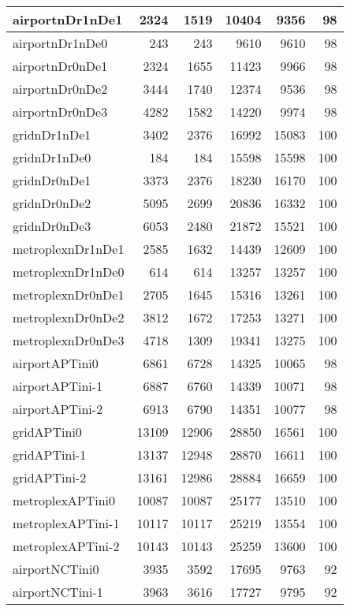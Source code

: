 \documentclass[../../../thesis.tex]{subfiles}
\begin{document}
\begin{longtable}{|l|r|r|r|r|r|}
\endlastfoot
airportnDr1nDe1 & 2324 & 1519 & 10404 & 9356 & 98 \\ \hline
airportnDr1nDe0 & 243 & 243 & 9610 & 9610 & 98 \\ \hline
airportnDr0nDe1 & 2324 & 1655 & 11423 & 9966 & 98 \\ \hline
airportnDr0nDe2 & 3444 & 1740 & 12374 & 9536 & 98 \\ \hline
airportnDr0nDe3 & 4282 & 1582 & 14220 & 9974 & 98 \\ \hline
gridnDr1nDe1 & 3402 & 2376 & 16992 & 15083 & 100 \\ \hline
gridnDr1nDe0 & 184 & 184 & 15598 & 15598 & 100 \\ \hline
gridnDr0nDe1 & 3373 & 2376 & 18230 & 16170 & 100 \\ \hline
gridnDr0nDe2 & 5095 & 2699 & 20836 & 16332 & 100 \\ \hline
gridnDr0nDe3 & 6053 & 2480 & 21872 & 15521 & 100 \\ \hline
metroplexnDr1nDe1 & 2585 & 1632 & 14439 & 12609 & 100 \\ \hline
metroplexnDr1nDe0 & 614 & 614 & 13257 & 13257 & 100 \\ \hline
metroplexnDr0nDe1 & 2705 & 1645 & 15316 & 13261 & 100 \\ \hline
metroplexnDr0nDe2 & 3812 & 1672 & 17253 & 13271 & 100 \\ \hline
metroplexnDr0nDe3 & 4718 & 1309 & 19341 & 13275 & 100 \\ \hline
airportAPTini0 & 6861 & 6728 & 14325 & 10065 & 98 \\ \hline
airportAPTini-1 & 6887 & 6760 & 14339 & 10071 & 98 \\ \hline
airportAPTini-2 & 6913 & 6790 & 14351 & 10077 & 98 \\ \hline
gridAPTini0 & 13109 & 12906 & 28850 & 16561 & 100 \\ \hline
gridAPTini-1 & 13137 & 12948 & 28870 & 16611 & 100 \\ \hline
gridAPTini-2 & 13161 & 12986 & 28884 & 16659 & 100 \\ \hline
metroplexAPTini0 & 10087 & 10087 & 25177 & 13510 & 100 \\ \hline
metroplexAPTini-1 & 10117 & 10117 & 25219 & 13554 & 100 \\ \hline
metroplexAPTini-2 & 10143 & 10143 & 25259 & 13600 & 100 \\ \hline
airportNCTini0 & 3935 & 3592 & 17695 & 9763 & 92 \\ \hline
airportNCTini-1 & 3963 & 3616 & 17727 & 9795 & 92 \\ \hline

\end{longtable}
\end{document}
